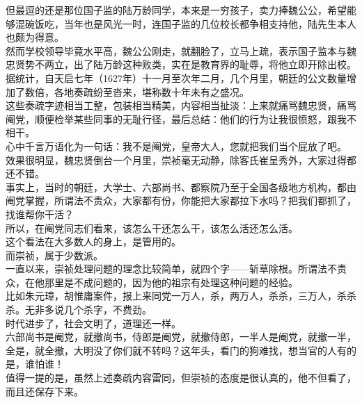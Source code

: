 \begin{multicols}{\theparacolNo}
但最逗的还是那位国子监的陆万龄同学，本来是一穷孩子，卖力捧魏公公，希望能够混碗饭吃，当年也是风光一时，连国子监的几位校长都争相支持他，陆先生本人也颇为得意。\\

然而学校领导毕竟水平高，魏公公刚走，就翻脸了，立马上疏，表示国子监本与魏忠贤势不两立，出了陆万龄这种败类，实在是教育界的耻辱，将他立即开除出校。\\

据统计，自天启七年（1627年）十一月至次年二月，几个月里，朝廷的公文数量增加了数倍，各地奏疏纷至沓来，堪称数十年未有之盛况。\\

这些奏疏字迹相当工整，包装相当精美，内容相当扯淡：上来就痛骂魏忠贤，痛骂阉党，顺便检举某些同事的无耻行径，最后总结：他们的行为让我很愤怒，跟我不相干。\\

心中千言万语化为一句话：我不是阉党，皇帝大人，您就把我们当个屁放了吧。\\

效果很明显，魏忠贤倒台一个月里，崇祯毫无动静，除客氏崔呈秀外，大家过得都还不错。\\

事实上，当时的朝廷，大学士、六部尚书、都察院乃至于全国各级地方机构，都由阉党掌握，所谓法不责众，大家都有份，你能把大家都拉下水吗？把我们都抓了，找谁帮你干活？\\

所以，在阉党同志们看来，该怎么干还怎么干，该怎么活还怎么活。\\

这个看法在大多数人的身上，是管用的。\\

而崇祯，属于少数派。\\

一直以来，崇祯处理问题的理念比较简单，就四个字——斩草除根。所谓法不责众，在他那里是不成问题的，因为他的祖宗有处理这种问题的经验。\\

比如朱元璋，胡惟庸案件，报上来同党一万人，杀，两万人，杀杀，三万人，杀杀杀。无非多说几个杀字，不费劲。\\

时代进步了，社会文明了，道理还一样。\\

六部尚书是阉党，就撤尚书，侍郎是阉党，就撤侍郎，一半人是阉党，就撤一半，全是，就全撤，大明没了你们就不转吗？这年头，看门的狗难找，想当官的人有的是，谁怕谁！\\

值得一提的是，虽然上述奏疏内容雷同，但崇祯的态度是很认真的，他不但看了，而且还保存下来。\\


\end{multicols}
